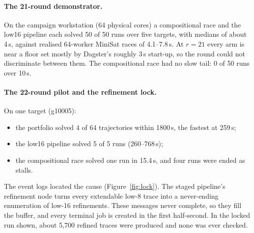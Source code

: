 \documentclass[11pt,a4paper]{article}
\begin{document}
\paragraph{The 21-round demonstrator.} On the campaign workstation (64 physical cores) a compositional race and the low16
pipeline each solved 50 of 50 runs over five targets, with medians of about 4\,s, against realised
64-worker MiniSat races of 4.1--7.8\,s. At $r=21$ every arm is near a floor set mostly by Dagster's
roughly 3\,s start-up, so the round could not discriminate between them. The compositional race had
no slow tail: 0 of 50 runs over 10\,s.

\paragraph{The 22-round pilot and the refinement lock.} On one target (g10005):
\begin{itemize}
\item the portfolio solved 4 of 64 trajectories within 1800\,s, the fastest at 259\,s;
\item the low16 pipeline solved 5 of 5 runs (260--768\,s);
\item the compositional race solved one run in 15.4\,s, and four runs were ended as stalls.
\end{itemize}
The event logs located the cause (Figure~\ref{fig:lock}). The staged pipeline's refinement node
turns every extendable low-8 trace into a never-ending enumeration of low-16 refinements. These
messages never complete, so they fill the buffer, and every terminal job is created in the first
half-second. In the locked run shown, about 5{,}700 refined traces were produced and none was ever
checked.
\end{document}
